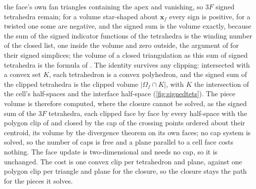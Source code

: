 \documentclass[preprint,12pt]{elsarticle}
\newcommand{\x}{\mathbf{x}}
\begin{document}
the face's own fan triangles containing the apex and vanishing, so $3F$ signed tetrahedra remain; for a volume star-shaped about $\x_f$ every sign is positive, for a twisted one some are negative, and the signed sum is the volume exactly, because the sum of the signed indicator functions of the tetrahedra is the winding number of the closed list, one inside the volume and zero outside, the argument of \citet{OwkesDesjardins2014Unsplit} for their signed simplices; the volume of a closed triangulation as this sum of signed tetrahedra is the formula of \citet{ZhangChen2001}. The identity survives any clipping: intersected with a convex set $K$, each tetrahedron is a convex polyhedron, and the signed sum of the clipped tetrahedra is the clipped volume $|\Omega_f \cap K|$, with $K$ the intersection of the cell's half-spaces and the interface half-space (\cref{fig:signedtets}). The piece volume is therefore computed, where the closure cannot be solved, as the signed sum of the $3F$ tetrahedra, each clipped face by face by every half-space with the polygon clip of \citet{SutherlandHodgman1974} and closed by the cap of the crossing points ordered about their centroid, its volume by the divergence theorem on its own faces; no cap system is solved, so the number of caps is free and a plane parallel to a cell face costs nothing. The face update is two-dimensional and needs no cap, so it is unchanged. The cost is one convex clip per tetrahedron and plane, against one polygon clip per triangle and plane for the closure, so the closure stays the path for the pieces it solves.
\end{document}
